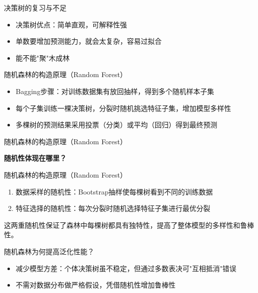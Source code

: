 \documentclass{beamer}
\begin{document}
\begin{frame}{决策树的复习与不足}
  \begin{itemize}[<+->]
    \item 决策树优点：简单直观，可解释性强
    \item 单数要增加预测能力，就会太复杂，容易过拟合
    \item 能不能"聚"木成林
  \end{itemize}
\end{frame}

\begin{frame}{随机森林的构造原理（Random Forest）}
  \begin{itemize}
    \item Bagging步骤：对训练数据集有放回抽样，得到多个随机样本子集
    \item 每个子集训练一棵决策树，分裂时随机挑选特征子集，增加模型多样性
    \item 多棵树的预测结果采用投票（分类）或平均（回归）得到最终预测
  \end{itemize}
\end{frame}

\begin{frame}{随机森林的构造原理（Random Forest）}
  \begin{center}
    \textbf{随机性体现在哪里？}
  \end{center}
\end{frame}


\begin{frame}{随机森林的构造原理（Random Forest）}
  \begin{theorem}[随机森林的两重随机性]
    \begin{enumerate}
      \item 数据采样的随机性：Bootstrap抽样使每棵树看到不同的训练数据
      \item 特征选择的随机性：每次分裂时随机选择特征子集进行最优分裂
    \end{enumerate}
    这两重随机性保证了森林中每棵树都具有独特性，提高了整体模型的多样性和鲁棒性。
  \end{theorem}
\end{frame}


\begin{frame}{随机森林为何提高泛化性能？}
  \begin{itemize}
    \item 减少模型方差：个体决策树虽不稳定，但通过多数表决可"互相抵消"错误
    \item 不需对数据分布做严格假设，凭借随机性增加鲁棒性
  \end{itemize}
\end{frame}
\end{document}
